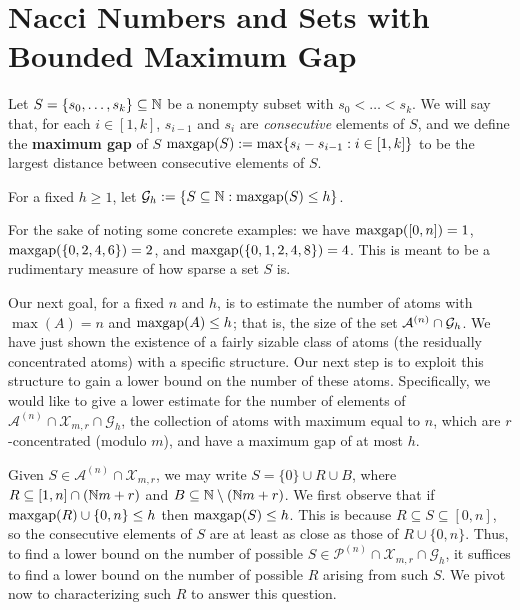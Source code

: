 \section{Nacci Numbers and Sets with Bounded Maximum Gap}

\begin{defn} \label{def:maxgap}
Let $S = \{s_0,\dots, s_k\} \subseteq \mathbb{N}$ be a nonempty subset with $s_0 < \dots < s_k$.
We will say that, for each $i\in [1,k]$, $s_{i-1}$ and $s_i$ are \textit{consecutive} elements of $S$, and we define the \textbf{maximum gap} of $S$ $\operatorname{maxgap}(S) := \max \{s_i - s_{i-1} : i\in [1,k]\}$ to be the largest distance between consecutive elements of $S$.

For a fixed $h\ge 1$, let $\mathcal{G}_h := \{S\subseteq \mathbb{N}: \operatorname{maxgap}(S) \le h\}$.
\end{defn}

For the sake of noting some concrete examples: we have $\operatorname{maxgap}([0,n]) = 1$, $\operatorname{maxgap}(\{0,2,4,6\}) = 2$, and $\operatorname{maxgap}(\{0,1,2,4,8\}) = 4$.
This is meant to be a rudimentary measure of how sparse a set $S$ is.

Our next goal, for a fixed $n$ and $h$, is to estimate the number of atoms with $\max(A) = n$ and $\operatorname{maxgap}(A) \le h$; that is, the size of the set $\mathcal{A}^{(n)}\cap \mathcal{G}_h$.
We have just shown the existence of a fairly sizable class of atoms (the residually concentrated atoms) with a specific structure.  
Our next step is to exploit this structure to gain a lower bound on the number of these atoms.
Specifically, we would like to give a lower estimate for the number of elements of $\mathcal{A}^{(n)}\cap \mathcal{X}_{m,r} \cap \mathcal{G}_h$, the collection of atoms with maximum equal to $n$, which are $r$-concentrated (modulo $m$), and have a maximum gap of at most $h$.

Given $S\in \mathcal{A}^{(n)}\cap \mathcal{X}_{m,r}$, we may write $S = \{0\}\cup R \cup B$, where $R \subseteq [1,n]\cap (\mathbb{N} m+r)$ and $B\subseteq \mathbb{N}\setminus (\mathbb{N} m + r)$.
We first observe that if $\operatorname{maxgap}(R)\cup\{0,n\}\le h$ then $\operatorname{maxgap}(S)\le h$. 
This is because $R\subseteq S\subseteq [0,n]$, so the consecutive elements of $S$ are at least as close as those of $R\cup\{0,n\}$.
Thus, to find a lower bound on the number of possible $S\in \mathcal{P}^{(n)}\cap \mathcal{X}_{m,r}\cap \mathcal{G}_h$, it suffices to find a lower bound on the number of possible $R$ arising from such $S$.
We pivot now to characterizing such $R$ to answer this question.


